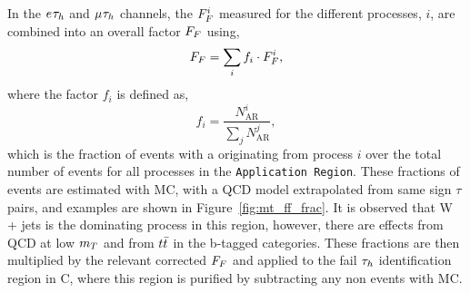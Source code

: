 In the $e_{}\tau_{h}$ and $\mu_{}\tau_{h}$ channels, the $F_{F}^{i}$ measured for the different processes, $i$, are combined into an overall factor $F_{F}$ using,
\begin{equation}
F_{F} = \sum_{i}f_{i}\cdot F_{F}^{i},
\end{equation}
where the factor $f_{i}$ is defined as,
\begin{equation}
f_{i} = \frac{N_{\text{AR}}^{i}}{\sum\limits_{j}N_{\text{AR}}^{j}},
\end{equation}
which is the fraction of events with a \jtth originating from process $i$ over the total number of \jtth events for all processes in the \texttt{Application Region}.
These fractions of events are estimated with \ac{MC}, with a \ac{QCD} model extrapolated from same sign $\tau$ pairs, and examples are shown in Figure~\ref{fig:mt_ff_frac}.
It is observed that W + jets is the dominating process in this region, however, there are effects from \ac{QCD} at low $m_{T}$ and from $t\bar{t}$ in the b-tagged categories. 
These fractions are then multiplied by the relevant corrected $F_{F}$ and applied to the fail $\tau_{h}$ identification region in C, where this region is purified by subtracting any non \jtth events with \ac{MC}. \\

